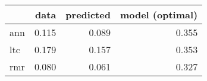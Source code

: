 \begin{tabular}{lrrr}
\toprule
{} &   data &  predicted &  model (optimal) \\
\midrule
ann &  0.115 &      0.089 &            0.355 \\
ltc &  0.179 &      0.157 &            0.353 \\
rmr &  0.080 &      0.061 &            0.327 \\
\bottomrule
\end{tabular}
